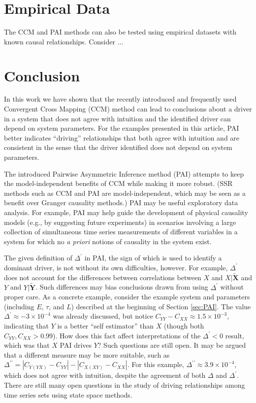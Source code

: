 \documentclass[twocolumn,aps,pre,groupedaddress]{revtex4-1}
\begin{document}
\section{Empirical Data}
The CCM and PAI methods can also be tested using empirical datasets with known causal relationships.  Consider $\ldots$

\section{Conclusion}
In this work we have shown that the recently introduced and frequently used Convergent Cross Mapping (CCM) method can lead to conclusions about a driver in a system that does not agree with intuition and the identified driver can depend on system parameters.  For the examples presented in this article, PAI better indicates ``driving'' relationships that both agree with intuition and are consistent in the sense that the driver identified does not depend on system parameters.  

The introduced Pairwise Asymmetric Inference method (PAI) attempts to keep the model-independent benefits of CCM while making it more robust. (SSR methods such as CCM and PAI are model-independent, which may be seen as a benefit over Granger causality methods.) PAI may be useful exploratory data analysis.  For example, PAI may help guide the development of physical causality models (e.g., by suggesting future experiments) in scenarios involving a large collection of simultaneous time series measurements of different variables in a system for which no {\em a priori} notions of causality in the system exist. 

The given definition of $\Delta^\prime$ in PAI, the sign of which is used to identify a dominant driver, is not without its own difficulties, however.  For example, $\Delta^\prime$ does not account for the differences between correlations between $X$ and $X|\tilde{\mathbf{X}}$ and $Y$ and $Y|\tilde{\mathbf{Y}}$.  Such differences may bias conclusions drawn from using $\Delta^\prime$ without proper care.  As a concrete example, consider the example system and parameters (including $E$, $\tau$, and $L$) described at the beginning of Section \ref{sec:PAI}.  The value $\Delta^\prime \approx -3\times 10^{-4}$ was already discussed, but notice $C_{YY}-C_{XX} \approx 1.5\times10^{-3}$, indicating that $Y$ is a better ``self estimator'' than $X$ (though both $C_{YY},C_{XX}>0.99$).  How does this fact affect interpretations of the $\Delta^\prime<0$ result, which was that $X$ PAI drives $Y$?  Such questions are still open.  It may be argued that a different measure may be more suitable, such as $\Delta^{\prime\prime} = |C_{Y(YX)}-C_{YY}|-|C_{X(XY)}-C_{XX}|$.  For this example, $\Delta^{\prime\prime} \approx 3.9\times 10^{-4}$, which does not agree with intuition, despite the agreement of both $\Delta$ and $\Delta^\prime$.  There are still many open questions in the study of driving relationships among time series sets using state space methods.
\end{document}
